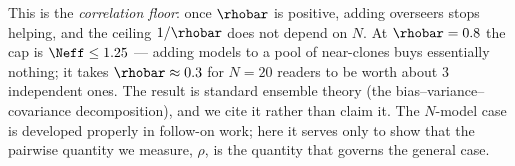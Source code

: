 This is the \emph{correlation floor}: once $\rhobar$ is positive, adding
overseers stops helping, and the ceiling $1/\rhobar$ does not depend on $N$. At
$\rhobar = 0.8$ the cap is $\Neff \le 1.25$ --- adding models to a pool of
near-clones buys essentially nothing; it takes $\rhobar \approx 0.3$ for $N = 20$
readers to be worth about $3$ independent ones. The result is standard ensemble
theory (the bias--variance--covariance decomposition), and we cite it rather than
claim it. The $N$-model case is developed properly in follow-on work; here it
serves only to show that the pairwise quantity we measure, $\rho$, is the
quantity that governs the general case.
